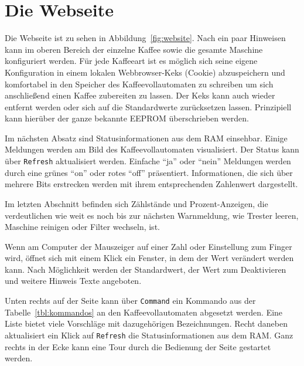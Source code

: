 \section{Die Webseite}

Die Webseite ist zu sehen in Abbildung~\ref{fig:website}.
Nach ein paar Hinweisen kann im oberen Bereich der einzelne Kaffee sowie die gesamte Maschine konfiguriert werden.
Für jede Kaffeeart ist es möglich sich seine eigene Konfiguration in einem lokalen Webbrowser-Keks (Cookie) abzuspeichern und komfortabel in den Speicher des Kaffeevollautomaten zu schreiben um sich anschließend einen Kaffee zubereiten zu lassen.
Der Keks kann auch wieder entfernt werden oder sich auf die Standardwerte zurücksetzen lassen.
Prinzipiell kann hierüber der ganze bekannte \ac{EEPROM} überschrieben werden.

Im nächsten Absatz sind Statusinformationen aus dem \ac{RAM} einsehbar.
Einige Meldungen werden am Bild des Kaffeevollautomaten visualisiert.
Der Status kann über \texttt{Refresh} aktualisiert werden.
Einfache "`ja"' oder "`nein"' Meldungen werden durch eine grünes "`on"' oder rotes "`off"' präsentiert.
Informationen, die sich über mehrere Bits erstrecken werden mit ihrem entsprechenden Zahlenwert dargestellt.

Im letzten Abschnitt befinden sich Zählstände und Prozent-Anzeigen, die verdeutlichen wie weit es noch bis zur nächsten Warnmeldung, wie Trester leeren, Maschine reinigen oder Filter wechseln, ist.

Wenn am Computer der Mauszeiger auf einer Zahl oder Einstellung zum Finger wird, öffnet sich mit einem Klick ein Fenster, in dem der Wert verändert werden kann.
Nach Möglichkeit werden der Standardwert, der Wert zum Deaktivieren und weitere Hinweis Texte angeboten.

Unten rechts auf der Seite kann über \texttt{Command} ein Kommando aus der Tabelle~\ref{tbl:kommandos} an den Kaffeevollautomaten abgesetzt werden.
Eine Liste bietet viele Vorschläge mit dazugehörigen Bezeichnungen.
Recht daneben aktualisiert ein Klick auf \texttt{Refresh} die Statusinformationen aus dem \ac{RAM}.
Ganz rechts in der Ecke kann eine Tour durch die Bedienung der Seite gestartet werden.

